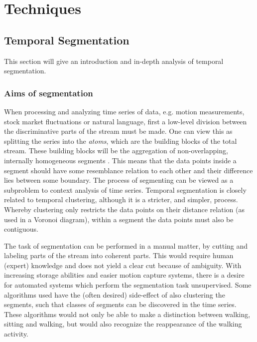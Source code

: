 
\chapter{Techniques} %

\label{Chapter2} %





\section{Temporal Segmentation}
This section will give an introduction and in-depth analysis of temporal segmentation.

\subsection{Aims of segmentation}
When processing and analyzing time series of data, e.g. motion measurements, stock market fluctuations or natural language, first a low-level division between the discriminative parts of the stream must be made.
One can view this as splitting the series into the \emph{atoms}, which are the building blocks of the total stream.
These building blocks will be the aggregation of non-overlapping, internally homogeneous segments \cite{himberg2001time}.
This means that the data points inside a segment should have some resemblance relation to each other and their difference lies between some boundary.
The process of segmenting can be viewed as a subproblem to context analysis of time series.
Temporal segmentation is closely related to temporal clustering, although it is a stricter, and simpler, process.
Whereby clustering only restricts the data points on their distance relation (as used in a Voronoi diagram), within a segment the data points must also be contiguous.

The task of segmentation can be performed in a manual matter, by cutting and labeling parts of the stream into coherent parts.
This would require human (expert) knowledge and does not yield a clear cut because of ambiguity.
With increasing storage abilities and easier motion capture systems, there is a desire for automated systems which perform the segmentation task unsupervised.
Some algorithms used have the (often desired) side-effect of also clustering the segments, such that classes of segments can be discovered in the time series.
These algorithms would not only be able to make a distinction between walking, sitting and walking, but would also recognize the reappearance of the walking activity.

